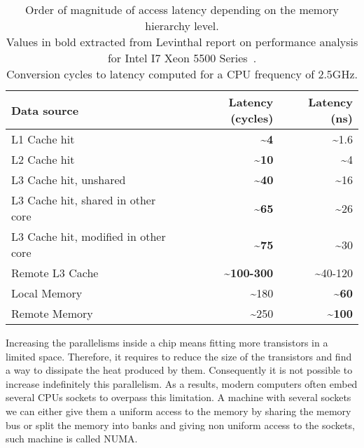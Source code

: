 \begin{table}[htb]
    \centering
    \begin{tabular}{lrr}
        \toprule
        \textbf{Data source} & \textbf{Latency (cycles)} & \textbf{Latency (ns)}\\
        \midrule
        L1 Cache hit                            & \textbf{\textasciitilde4}          & \textasciitilde1.6\\
        L2 Cache hit                            & \textbf{\textasciitilde10}         & \textasciitilde4\\
        \midrule
        L3 Cache hit, unshared                  & \textbf{\textasciitilde40}         & \textasciitilde16\\
        L3 Cache hit, shared in other core      & \textbf{\textasciitilde65}         & \textasciitilde26\\
        L3 Cache hit, modified in other core    & \textbf{\textasciitilde75}         & \textasciitilde30\\
        Remote L3 Cache                         & \textbf{\textasciitilde100-300}    & \textasciitilde40-120\\
        \midrule
        Local Memory                            & \textasciitilde180                 & \textbf{\textasciitilde60} \\
        Remote Memory                           & \textasciitilde250                 & \textbf{\textasciitilde100} \\
        \bottomrule
    \end{tabular}
    \caption[Approximate access latency depending on the memory hierarchy level.]{Order of magnitude of access latency depending on the memory hierarchy level.\\
    Values in bold extracted from Levinthal report on performance analysis for \gls{Intel} I7 Xeon 5500 Series~\cite{Levinthal09Performance}.\\
    Conversion cycles to latency computed for a CPU frequency of 2.5GHz.
}
\label{tab:mem-latency}
\end{table}
Increasing the parallelisms inside a chip means fitting more transistors in a limited space.
Therefore, it requires to reduce the size of the transistors and find a way to dissipate the heat produced by them.
Consequently it is not possible to increase indefinitely this parallelism.
As a results, modern computers often embed several \glspl{CPU} sockets to overpass this limitation.
A machine with several sockets we can either give them a uniform access to the memory by sharing the memory bus or split the memory into banks and giving non uniform access to the sockets, such machine is called \gls{NUMA}.
